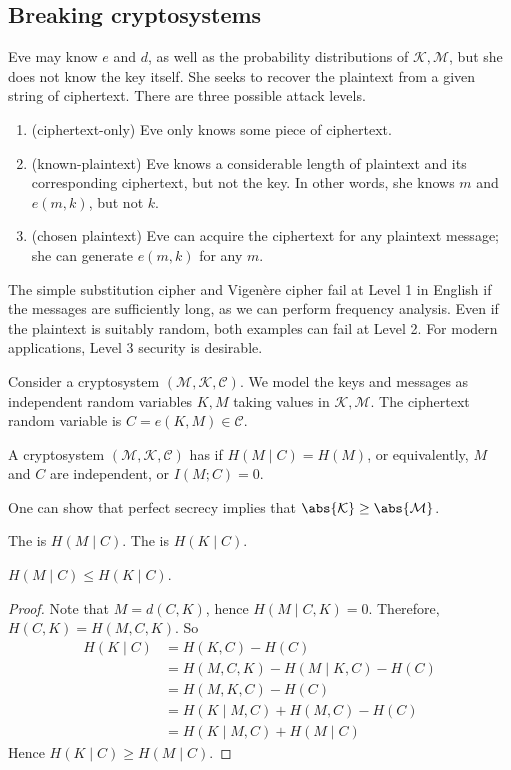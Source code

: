\subsection{Breaking cryptosystems}
Eve may know $e$ and $d$, as well as the probability distributions of $\mathcal K, \mathcal M$, but she does not know the key itself.
She seeks to recover the plaintext from a given string of ciphertext.
There are three possible attack levels.
\begin{enumerate}
    \item (ciphertext-only) Eve only knows some piece of ciphertext.
    \item (known-plaintext) Eve knows a considerable length of plaintext and its corresponding ciphertext, but not the key.
    In other words, she knows $m$ and $e(m,k)$, but not $k$.
    \item (chosen plaintext) Eve can acquire the ciphertext for any plaintext message; she can generate $e(m,k)$ for any $m$.
\end{enumerate}
\begin{remark}
    The simple substitution cipher and Vigen\`ere cipher fail at Level 1 in English if the messages are sufficiently long, as we can perform frequency analysis.
    Even if the plaintext is suitably random, both examples can fail at Level 2.
    For modern applications, Level 3 security is desirable.
\end{remark}
Consider a cryptosystem $(\mathcal M, \mathcal K, \mathcal C)$.
We model the keys and messages as independent random variables $K, M$ taking values in $\mathcal K, \mathcal M$.
The ciphertext random variable is $C = e(K,M) \in \mathcal C$.
\begin{definition}
    A cryptosystem $(\mathcal M, \mathcal K, \mathcal C)$ has  if $H(M \mid C) = H(M)$, or equivalently, $M$ and $C$ are independent, or $I(M;C) = 0$.
\end{definition}
One can show that perfect secrecy implies that $\abs{\mathcal K} \geq \abs{\mathcal M}$.
\begin{definition}
    The  is $H(M \mid C)$.
    The  is $H(K \mid C)$.
\end{definition}
\begin{lemma}
    $H(M \mid C) \leq H(K \mid C)$.
\end{lemma}
\begin{proof}
    Note that $M = d(C,K)$, hence $H(M \mid C, K) = 0$.
    Therefore, $H(C,K) = H(M,C,K)$.
    So
    \begin{align*}
        H(K \mid C) &= H(K,C) - H(C) \\
        &= H(M,C,K) - H(M \mid K,C) - H(C) \\
        &= H(M,K,C) - H(C) \\
        &= H(K \mid M,C) + H(M,C) - H(C) \\
        &= H(K \mid M, C) + H(M \mid C)
    \end{align*}
    Hence $H(K \mid C) \geq H(M \mid C)$.
\end{proof}
